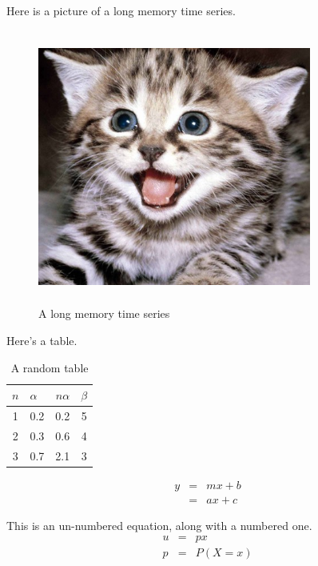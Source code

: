 Here is a picture of a long memory time series. 
\begin{figure}[ht]
\begin{center}
\includegraphics[height = 9cm, width = 9cm]{pic1.jpeg}
\caption{A long memory time series\label{ts1}}
\end{center}
\end{figure}

Here's a table.
\begin{table}[ht]
\begin{center}
\begin{tabular}[ht]{|c|lr|c|} 
\hline
$n$ & $\alpha$ &$n\alpha$ & $\beta$\\
\hline
1 & 0.2 & 0.2 & 5\\
\hline
2 & 0.3 & 0.6 & 4\\
\hline
3 & 0.7 & 2.1 & 3\\
\hline
\end{tabular}
\caption{A random table \label{tab1}}
\end{center}
\end{table}

\begin{eqnarray}
y &=& mx + b \label{eq1}\\
&=& ax+ c
\label{eq2}
\end{eqnarray}

This is an un-numbered equation, along with a numbered one. 
\begin{eqnarray}
u &=& px \nonumber\\
p &=& P(X=x) \label{eqn3}
\end{eqnarray}

